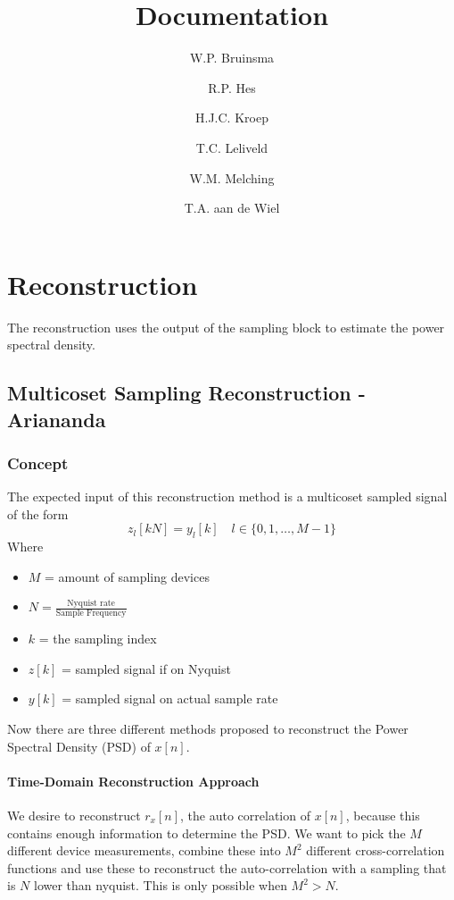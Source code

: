 \documentclass[report, oneside, a4paper, openany]{memoir}
\title{Documentation}
\author{W.P. Bruinsma \and R.P. Hes \and H.J.C. Kroep \and T.C. Leliveld \and W.M. Melching \and T.A. aan de Wiel}
\begin{document}
\chapter{Reconstruction}
The reconstruction uses the output of the sampling block to estimate the power spectral density.

\section{Multicoset Sampling Reconstruction -Ariananda}
\subsection{Concept}
The expected input of this reconstruction method is a multicoset sampled signal of the form 
$$z_l[kN]=y_l[k] \quad l \in \{0,1,\dots, M-1\}$$
Where
\begin{itemize}
\item $M$  = amount of sampling devices
\item $N = \frac{\text{Nyquist rate}}{\text{Sample Frequency}}$
\item $k$ = the sampling index
\item $z[k]$ = sampled signal if on Nyquist
\item $y[k]$ = sampled signal on actual sample rate
\end{itemize}

Now there are three different methods proposed to reconstruct the Power Spectral Density (PSD) of $x[n]$.

\subsubsection{Time-Domain Reconstruction Approach}
We desire to reconstruct $r_x[n]$, the auto correlation of $x[n]$, because this contains enough information to determine the PSD.
We want to pick the $M$ different device measurements, combine these into $M^2$ different cross-correlation functions and use these to reconstruct the auto-correlation with a sampling that is $N$ lower than nyquist. 
This is only possible when $M^2>N$.
\end{document}
